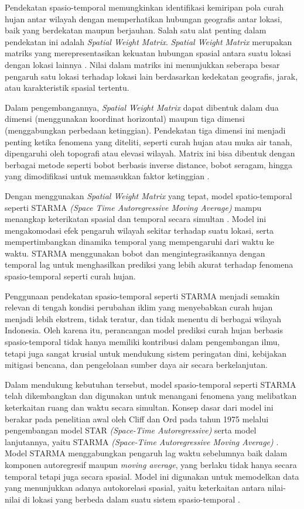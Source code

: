 Pendekatan spasio-temporal memungkinkan identifikasi kemiripan pola curah hujan antar wilayah dengan memperhatikan hubungan geografis antar lokasi, baik yang berdekatan maupun berjauhan. Salah satu alat penting dalam pendekatan ini adalah \textit{Spatial Weight Matrix}. \textit{Spatial Weight Matrix} merupakan matriks yang merepresentasikan kekuatan hubungan spasial antara suatu lokasi dengan lokasi lainnya \citep{mukhaiyar2024generalized}. Nilai dalam matriks ini menunjukkan seberapa besar pengaruh satu lokasi terhadap lokasi lain berdasarkan kedekatan geografis, jarak, atau karakteristik spasial tertentu.

Dalam pengembangannya, \textit{Spatial Weight Matrix} dapat dibentuk dalam dua dimensi (menggunakan koordinat horizontal) maupun tiga dimensi (menggabungkan perbedaan ketinggian). Pendekatan tiga dimensi ini menjadi penting ketika fenomena yang diteliti, seperti curah hujan atau muka air tanah, dipengaruhi oleh topografi atau elevasi wilayah. Matrix ini bisa dibentuk dengan berbagai metode seperti bobot berbasis inverse distance, bobot seragam, hingga yang dimodifikasi untuk memasukkan faktor ketinggian \citep{mukhaiyar2024generalized}.

Dengan menggunakan \textit{Spatial Weight Matrix} yang tepat, model spatio-temporal seperti STARMA \textit{(Space Time Autoregressive Moving Average)} mampu menangkap keterikatan spasial dan temporal secara simultan \citep{sharma2025integrating}. Model ini mengakomodasi efek pengaruh wilayah sekitar terhadap suatu lokasi, serta mempertimbangkan dinamika temporal yang mempengaruhi dari waktu ke waktu. STARMA menggunakan bobot dan mengintegrasikannya dengan temporal lag untuk menghasilkan prediksi yang lebih akurat terhadap fenomena spasio-temporal seperti curah hujan.  

Penggunaan pendekatan spasio-temporal seperti STARMA menjadi semakin relevan di tengah kondisi perubahan iklim yang menyebabkan curah hujan menjadi lebih ekstrem, tidak teratur, dan tidak menentu di berbagai wilayah Indonesia. Oleh karena itu, perancangan model prediksi curah hujan berbasis spasio-temporal tidak hanya memiliki kontribusi dalam pengembangan ilmu, tetapi juga sangat krusial untuk mendukung sistem peringatan dini, kebijakan mitigasi bencana, dan pengelolaan sumber daya air secara berkelanjutan.

Dalam mendukung kebutuhan tersebut, model spasio-temporal seperti STARMA telah dikembangkan dan digunakan untuk menangani fenomena yang melibatkan keterkaitan ruang dan waktu secara simultan. Konsep dasar dari model ini berakar pada penelitian awal oleh Cliff dan Ord pada tahun 1975 melalui pengembangan model STAR \textit{(Space-Time Autoregressive)} serta model lanjutannya, yaitu STARMA \textit{(Space-Time Autoregressive Moving Average)} \citep{laily2020hybrid}. Model STARMA menggabungkan pengaruh lag waktu sebelumnya baik dalam komponen autoregresif maupun \textit{moving average}, yang berlaku tidak hanya secara temporal tetapi juga secara spasial. Model ini digunakan untuk memodelkan data yang menunjukkan adanya autokorelasi spasial, yaitu keterkaitan antara nilai-nilai di lokasi yang berbeda dalam suatu sistem spasio-temporal \citep{rathod2018improved}.


